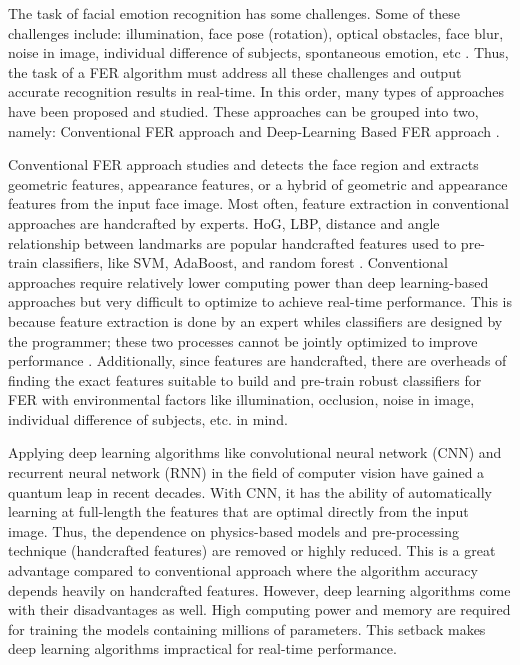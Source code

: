 \documentclass[master]{thesis-uestc}
\begin{document}
The task of facial emotion recognition has some challenges. Some of these challenges include: illumination, face pose (rotation), optical obstacles, face blur, noise in image, individual difference of subjects, spontaneous emotion, etc . Thus, the task of a FER algorithm must address all these challenges and output accurate recognition results in real-time. In this order, many types of approaches have been proposed and studied. These approaches can be grouped into two, namely: Conventional FER approach and Deep-Learning Based FER approach .

Conventional FER approach studies and detects the face region and extracts geometric features, appearance features, or a hybrid of geometric and appearance features from the input face image. Most often, feature extraction in conventional approaches are handcrafted by experts. HoG, LBP, distance and angle relationship between landmarks are popular handcrafted features used to pre-train classifiers, like SVM, AdaBoost, and random forest . Conventional approaches require relatively lower computing power than deep learning-based approaches but very difficult to optimize to achieve real-time performance. This is because feature extraction is done by an expert whiles classifiers are designed by the programmer; these two processes cannot be jointly optimized to improve performance . Additionally, since features are handcrafted, there are overheads of finding the exact features suitable to build and pre-train robust classifiers for FER with environmental factors like illumination, occlusion, noise in image, individual difference of subjects, etc. in mind.

Applying deep learning algorithms like convolutional neural network (CNN) and recurrent neural network (RNN) in the field of computer vision have gained a quantum leap in recent decades. With CNN, it has the ability of automatically learning at full-length the features that are optimal directly from the input image. Thus, the dependence on physics-based models and pre-processing technique (handcrafted features) are removed or highly reduced. This is a great advantage compared to conventional approach where the algorithm accuracy depends heavily on handcrafted features. However, deep learning algorithms come with their disadvantages as well. High computing power and memory are required for training the models containing millions of parameters. This setback makes deep learning algorithms impractical for real-time performance.
\end{document}
